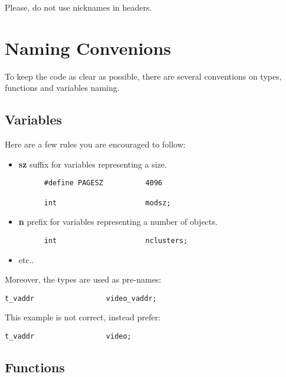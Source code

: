 Please, do not use nicknames in headers.

%
%

\section{Naming Convenions}

To keep the code as clear as possible, there are several conventions on
types, functions and variables naming.

%
%

\subsection{Variables}

Here are a few rules you are encouraged to follow:

\begin{itemize}
  \item
    \textbf{sz} suffix for variables representing a size.

    \begin{verbatim}
      #define PAGESZ          4096

      int                     modsz;
    \end{verbatim}
  \item
    \textbf{n} prefix for variables representing a number of objects.

    \begin{verbatim}
      int                     nclusters;
    \end{verbatim}
  \item
    etc..
\end{itemize}

Moreover, the types are used as pre-names:

\begin{verbatim}
t_vaddr                 video_vaddr;
\end{verbatim}

This example is not correct, instead prefer:

\begin{verbatim}
t_vaddr                 video;
\end{verbatim}

%
%

\subsection{Functions}

